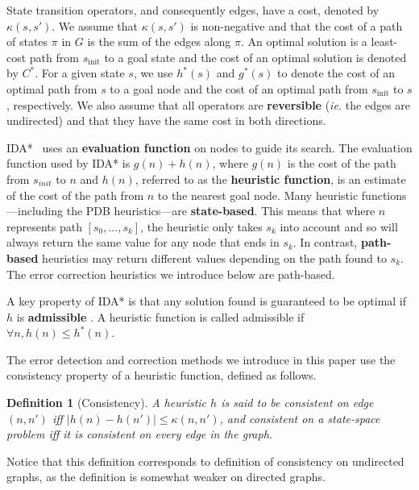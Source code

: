 \documentclass[letterpaper]{article}
\newtheorem{definition}{Definition}
\begin{document}
State transition operators, and consequently edges, have a cost, denoted by $\kappa(s, s')$. We assume that $\kappa(s, s')$ is non-negative and that the cost of a path of states $\pi$ in $G$ is the sum of the edges along $\pi$. An optimal solution is a least-cost path from $s_{\mathrm{init}}$ to a goal state and the cost of an optimal solution is denoted by $C^*$. For a given state $s$, we use $h^*(s)$ and $g^*(s)$ to denote the cost of an optimal path from $s$ to a goal node and the cost of an optimal path from $s_{\mathrm{init}}$ to $s$, respectively. %
We also assume that all operators are \textbf{reversible} (\textit{ie.} the edges are undirected) and that they have the same cost in both directions.



IDA*~\cite{korf85} uses an \textbf{evaluation function} on nodes to guide its search. The evaluation function used by IDA* is $g(n) + h(n)$, where $g(n)$ is the cost of the path from $s_{init}$ to $n$ and $h(n)$, referred to as the \textbf{heuristic function}, is an estimate of the cost of the path from $n$ to the nearest goal node.
Many heuristic functions---including the PDB heuristics---are \textbf{state-based}.
This means that where $n$ represents path $[s_0, ..., s_k]$, the heuristic  only takes $s_k$ into account and so will always return the same value for any node that ends in $s_k$.
In contrast, \textbf{path-based} heuristics may return different values depending on the path  found to $s_k$. The error correction heuristics we introduce below are path-based.


A key property of IDA* is that any solution found is guaranteed to be optimal if $h$ is \textbf{admissible} \cite{korf85}. A heuristic function is called admissible if $\forall n, h(n) \leq h^*(n)$.




The error detection and correction methods we introduce in this paper use the consistency property of a heuristic function, defined as follows.

\begin{definition}[Consistency]
A heuristic $h$ is said to be consistent on edge $(n,n')$ iff $|h(n) - h(n')| \le \kappa(n,n')$, and consistent on a state-space problem iff it is consistent on every edge in the graph.
\label{def:consistency}
\end{definition}
Notice that this definition corresponds to definition of consistency on undirected graphs, as the definition is somewhat weaker on directed graphs.
\end{document}
